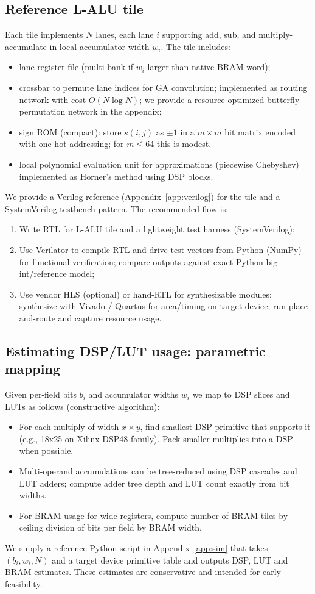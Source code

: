 \documentclass[11pt]{article}
\theoremstyle{definition}
\theoremstyle{plain}
\begin{document}
\subsection{Reference L-ALU tile}
Each tile implements $N$ lanes, each lane $i$ supporting add, sub, and multiply-accumulate in local accumulator width $w_i$. The tile includes:
\begin{itemize}
  \item lane register file (multi-bank if $w_i$ larger than native BRAM word);
  \item crossbar to permute lane indices for GA convolution; implemented as routing network with cost $O(N\log N)$; we provide a resource-optimized butterfly permutation network in the appendix;
  \item sign ROM (compact): store $s(i,j)$ as $\pm 1$ in a $m\times m$ bit matrix encoded with one-hot addressing; for $m\le 64$ this is modest.
  \item local polynomial evaluation unit for approximations (piecewise Chebyshev) implemented as Horner's method using DSP blocks.
\end{itemize}

We provide a Verilog reference (Appendix~\ref{app:verilog}) for the tile and a SystemVerilog testbench pattern.  The recommended flow is:
\begin{enumerate}
  \item Write RTL for L-ALU tile and a lightweight test harness (SystemVerilog);
  \item Use Verilator to compile RTL and drive test vectors from Python (NumPy) for functional verification; compare outputs against exact Python big-int/reference model;
  \item Use vendor HLS (optional) or hand-RTL for synthesizable modules; synthesize with Vivado / Quartus for area/timing on target device; run place-and-route and capture resource usage.
\end{enumerate}

\subsection{Estimating DSP/LUT usage: parametric mapping}
Given per-field bits $b_i$ and accumulator widths $w_i$ we map to DSP slices and LUTs as follows (constructive algorithm):
\begin{itemize}
  \item For each multiply of width $x\times y$, find smallest DSP primitive that supports it (e.g., 18x25 on Xilinx DSP48 family). Pack smaller multiplies into a DSP when possible.
  \item Multi-operand accumulations can be tree-reduced using DSP cascades and LUT adders; compute adder tree depth and LUT count exactly from bit widths.
  \item For BRAM usage for wide registers, compute number of BRAM tiles by ceiling division of bits per field by BRAM width.
\end{itemize}
We supply a reference Python script in Appendix~\ref{app:sim} that takes $(b_i,w_i,N)$ and a target device primitive table and outputs DSP, LUT and BRAM estimates.  These estimates are conservative and intended for early feasibility.
\end{document}

